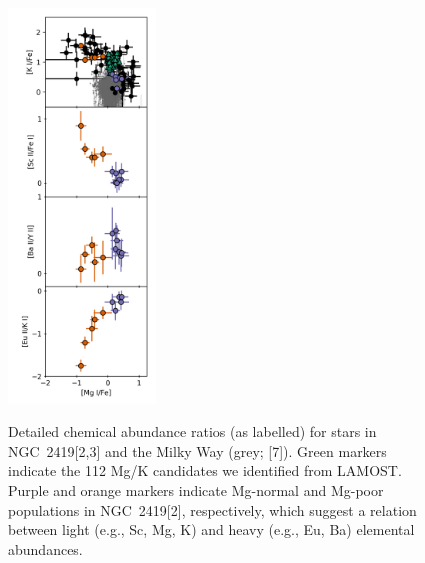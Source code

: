 \documentclass[12pt]{report}
\begin{document}
\setcounter{figure}{1}
\begin{figure}
\begin{center}
	\vspace{-2em}
	\includegraphics[width=0.35\textwidth]{figures/figure2.png}
	\caption{\small{Detailed chemical abundance ratios (as labelled) for stars in NGC~2419[2,3] and the Milky Way (grey; [7]). Green markers indicate the 112 Mg/K candidates we identified  from LAMOST. Purple and orange markers indicate Mg-normal and Mg-poor populations in NGC~2419[2], respectively, which suggest a relation between light (e.g., Sc, Mg, K) and heavy (e.g., Eu, Ba) elemental abundances.}}
	\vspace{-3em}
	\label{fig:mgk}
\end{center}
\end{figure}
\end{document}
